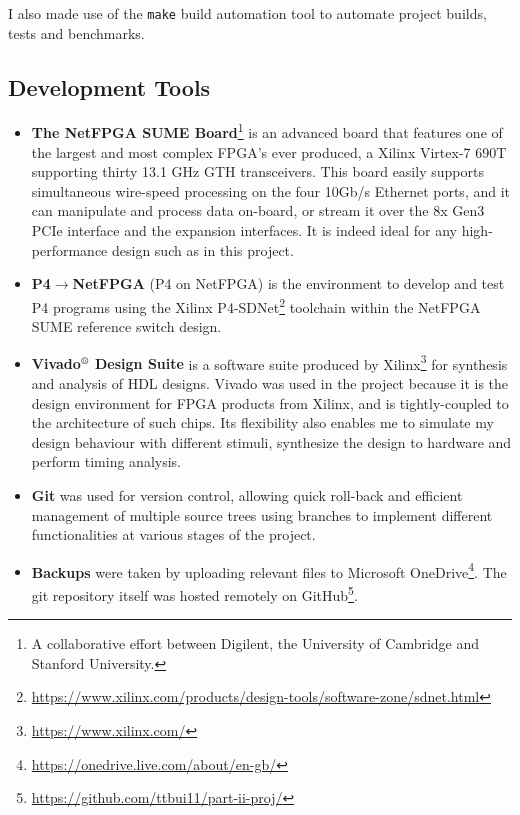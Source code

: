	I also made use of the \texttt{make} build automation tool to automate project builds, tests and benchmarks.
	
	\subsection{Development Tools}
	\begin{itemize}%
		\item \textbf{The NetFPGA SUME Board}\footnote{A collaborative effort between Digilent, the University of Cambridge and Stanford University.} is an advanced board that features one of the largest and most complex FPGA’s ever produced, a Xilinx Virtex-7 690T supporting thirty 13.1 GHz GTH transceivers. This board easily supports simultaneous wire-speed processing on the four 10Gb/s Ethernet ports, and it can manipulate and process data on-board, or stream it over the 8x Gen3 PCIe interface and the expansion interfaces. It is indeed ideal for any high-performance design such as in this project.
					
		\item \textbf{P4$\rightarrow$NetFPGA} (P4 on NetFPGA) is the environment to develop and test P4 programs using the Xilinx P4-SDNet\footnote{\url{https://www.xilinx.com/products/design-tools/software-zone/sdnet.html}} toolchain within the NetFPGA SUME reference switch design.
		
		\item \textbf{Vivado$^{\textrm{\textregistered}}$ Design Suite} is a software suite produced by Xilinx\footnote{\url{https://www.xilinx.com/}} for synthesis and analysis of HDL designs. Vivado was used in the project because it is the design environment for FPGA products from Xilinx, and is tightly-coupled to the architecture of such chips. Its flexibility also enables me to simulate my design behaviour with different stimuli, synthesize the design to hardware and perform timing analysis.
		
		\item \textbf{Git} was used for version control, allowing quick roll-back and efficient management of multiple source trees using branches to implement different functionalities at various stages of the project.
	
		\item \textbf{Backups} were taken by uploading relevant files to Microsoft OneDrive\footnote{\url{https://onedrive.live.com/about/en-gb/}}. The git repository itself was hosted remotely on GitHub\footnote{\url{https://github.com/ttbui11/part-ii-proj/}}.
	\end{itemize}

